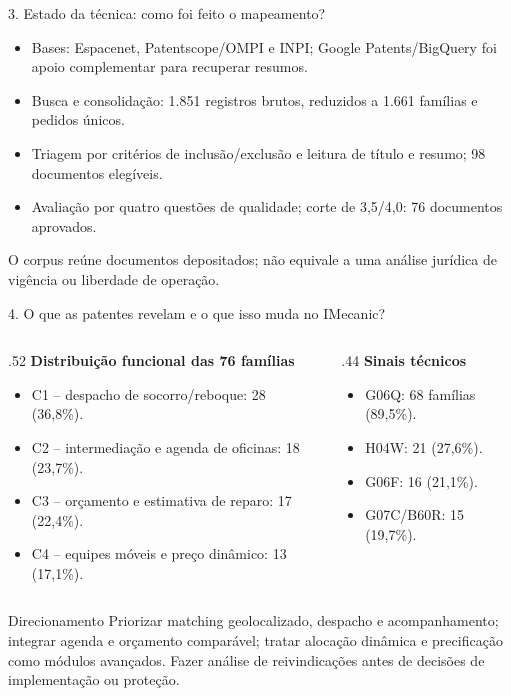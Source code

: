 \documentclass[aspectratio=169,10pt]{beamer}
\begin{document}
\begin{frame}{3. Estado da técnica: como foi feito o mapeamento?}
\begin{itemize}
\item Bases: Espacenet, Patentscope/OMPI e INPI; Google Patents/BigQuery foi apoio complementar para recuperar resumos.
\item Busca e consolidação: 1.851 registros brutos, reduzidos a 1.661 famílias e pedidos únicos.
\item Triagem por critérios de inclusão/exclusão e leitura de título e resumo; 98 documentos elegíveis.
\item Avaliação por quatro questões de qualidade; corte de 3,5/4,0: 76 documentos aprovados.
\end{itemize}
\begin{center}
\end{center}
\small O corpus reúne documentos depositados; não equivale a uma análise jurídica de vigência ou liberdade de operação.
\end{frame}
\begin{frame}{4. O que as patentes revelam e o que isso muda no IMecanic?}
\begin{columns}[T]
\begin{column}{.52\textwidth}
\textbf{Distribuição funcional das 76 famílias}
\begin{itemize}
\item C1 -- despacho de socorro/reboque: 28 (36,8\%).
\item C2 -- intermediação e agenda de oficinas: 18 (23,7\%).
\item C3 -- orçamento e estimativa de reparo: 17 (22,4\%).
\item C4 -- equipes móveis e preço dinâmico: 13 (17,1\%).
\end{itemize}
\end{column}
\begin{column}{.44\textwidth}
\textbf{Sinais técnicos}
\begin{itemize}
\item G06Q: 68 famílias (89,5\%).
\item H04W: 21 (27,6\%).
\item G06F: 16 (21,1\%).
\item G07C/B60R: 15 (19,7\%).
\end{itemize}
\end{column}
\end{columns}
\begin{block}{Direcionamento}
Priorizar matching geolocalizado, despacho e acompanhamento; integrar agenda e orçamento comparável; tratar alocação dinâmica e precificação como módulos avançados. Fazer análise de reivindicações antes de decisões de implementação ou proteção.
\end{block}
\end{frame}
\end{document}
